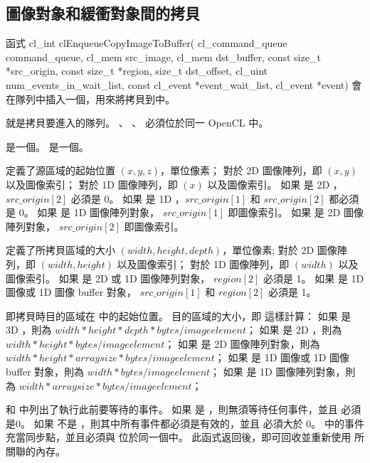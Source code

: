 \subsection{圖像對象和緩衝對象間的拷貝}

函式
\startCLFUNC
cl_int clEnqueueCopyImageToBuffer(
			cl_command_queue command_queue,
			cl_mem src_image,
			cl_mem dst_buffer,
			const size_t *src_origin,
			const size_t *region,
			size_t dst_offset,
			cl_uint num_events_in_wait_list,
			const cl_event *event_wait_list,
			cl_event *event)
\stopCLFUNC
會在隊列中插入一個，用來將拷貝到中。

 就是拷貝要進入的隊列。
、 、  必須位於同一 OpenCL 中。

 是一個。
 是一個。

 定義了源區域的起始位置 $(x, y, z)$，單位像素；
對於 2D 圖像陣列，即 $(x, y)$ 以及圖像索引；
對於 1D 圖像陣列，即 $(x)$ 以及圖像索引。
如果  是 2D ， $src\_origin[2]$ 必須是 0。
如果  是 1D ，$src\_origin[1]$ 和 $src\_origin[2]$ 都必須是 0。
如果  是 1D 圖像陣列對象， $src\_origin[1]$ 即圖像索引。
如果  是 2D 圖像陣列對象， $src\_origin[2]$ 即圖像索引。

 定義了所拷貝區域的大小 $(width, height, depth)$，單位像素;
對於 2D 圖像陣列，即 $(width, height)$ 以及圖像索引；
對於 1D 圖像陣列，即 $(width)$ 以及圖像索引。
如果  是 2D  或 1D 圖像陣列對象， $region[2]$ 必須是 1。
如果  是 1D 圖像或 1D 圖像 buffer 對象， $src\_origin[1]$ 和 $region[2]$ 必須是 1。

 即拷貝時目的區域在  中的起始位置。
目的區域的大小，即  這樣計算：
如果  是 3D ，則為 $width * height * depth * bytes/image element$；
如果  是 2D ，則為 $width * height * bytes/image element$；
如果  是 2D 圖像陣列對象，則為 $width * height * arraysize * bytes/image element$；
如果  是 1D 圖像或 1D 圖像 buffer 對象，則為 $width * bytes/image element$；
如果  是 1D 圖像陣列對象，則為 $width * arraysize * bytes/image element$；

 和  中列出了執行此前要等待的事件。
如果  是 ，則無須等待任何事件，並且  必須是0。
如果  不是 ，則其中所有事件都必須是有效的，並且  必須大於 0。
 中的事件充當同步點，並且必須與  位於同一個中。
此函式返回後，即可回收並重新使用  所關聯的內存。

